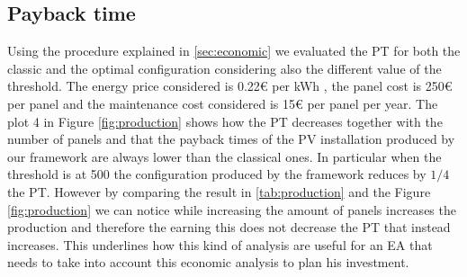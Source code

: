 \subsection{Payback time}
Using the procedure explained in \ref{sec:economic} we evaluated the PT for both the classic and the optimal configuration considering also the different value of the threshold. The energy price considered is 0.22€ per kWh \cite{energy_price}, the panel cost is 250€ per panel and the maintenance cost considered is 15€ per panel per year. The plot 4 in Figure \ref{fig:production} shows how the PT decreases together with the number of panels and that the payback times of the PV installation produced by our framework are always lower than the classical ones. In particular when the threshold is at 500 the configuration produced by the framework reduces by $1/4$ the PT. However by comparing the result in \ref{tab:production} and the Figure \ref{fig:production} we can notice while increasing the amount of panels increases the production and therefore the earning this does not decrease the PT that instead increases. This underlines how this kind of analysis are useful for an EA that needs to take into account this economic analysis to plan his investment.



